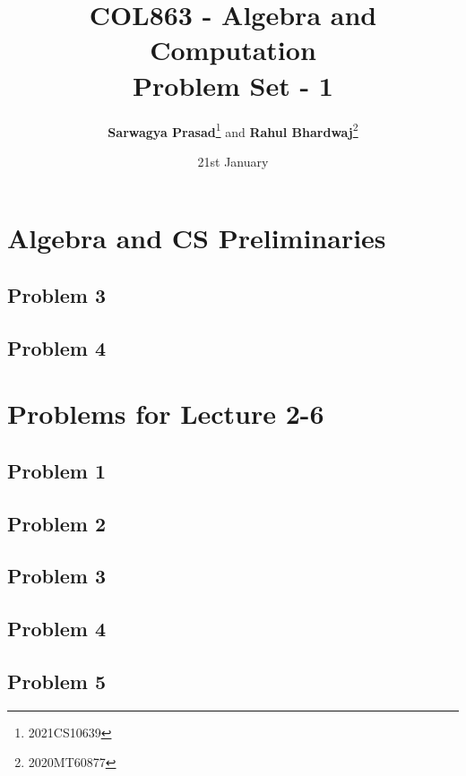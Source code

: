 \documentclass[tikz,
	10pt,
	parskip=half-,		
	paper=a4,			
	english	
	]{scrartcl}
\title{COL863 - Algebra and Computation \\ Problem Set - 1}
\author{\textbf{Sarwagya Prasad}\thanks{2021CS10639} and \textbf{Rahul Bhardwaj}\thanks{2020MT60877}}
\date{21st January}
\begin{document}
\maketitle			
\tableofcontents
\newpage

\section{Algebra and CS Preliminaries}
\subsection{Problem 3}


\subsection{Problem 4}



\section{Problems for Lecture 2-6}

\subsection{Problem 1}

\subsection{Problem 2}

\subsection{Problem 3}

\subsection{Problem 4}

\subsection{Problem 5}

\end{document}
